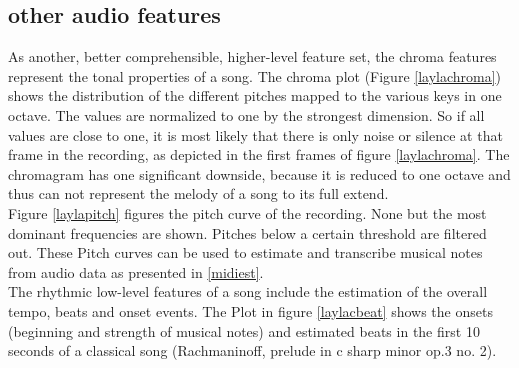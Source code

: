 \subsection{other audio features}

As another, better comprehensible, higher-level feature set, the chroma features represent the tonal properties of a song. The chroma plot (Figure \ref{laylachroma}) shows the distribution of the different pitches mapped to the various keys in one octave. The values are normalized to one by the strongest dimension. So if all values are close to one, it is most likely that there is only noise or silence at that frame in the recording, as depicted in the first frames of figure \ref{laylachroma}. The chromagram has one significant downside, because it is reduced to one octave and thus can not represent the melody of a song to its full extend.\\
Figure \ref{laylapitch} figures the pitch curve of the recording. None but the most dominant frequencies are shown. Pitches below a certain threshold are filtered out. These Pitch curves can be used to estimate and transcribe musical notes from audio data as presented in \ref{midiest}.\\
The rhythmic low-level features of a song include the estimation of the overall tempo, beats and  onset events. 
The Plot in figure \ref{laylacbeat} shows the onsets (beginning and strength of musical notes) and estimated beats in the first 10 seconds of a classical song (Rachmaninoff, prelude in c sharp minor op.3 no. 2).
